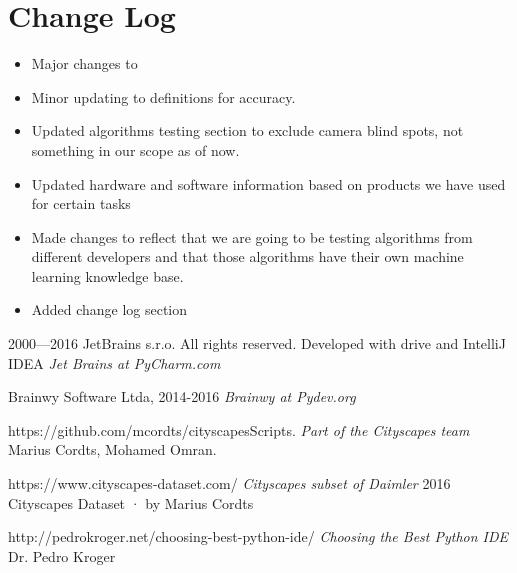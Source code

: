 \documentclass[10pt,draftclsnofoot,onecolumn,journal,compsoc]{IEEEtran}
\begin{document}
	\section{Change Log}
	\begin{itemize}
		\item Major changes to
		\item Minor updating to definitions for accuracy.
		\item Updated algorithms testing section to exclude camera blind spots, not something in our scope as of now.
		\item Updated hardware and software information based on products we have used for certain tasks
		\item Made changes to reflect that we are going to be testing algorithms from different developers and that those algorithms have their own machine learning knowledge base.
		\item Added change log section 
	\end{itemize}
	
	
	\newcommand{\firstdayoffallterm}{2016-09-21}      %
	\newcommand{\startday}{2016-10-02}                %
	\newcommand{\fallprogressreportdue}{2016-12-05}   %
	\newcommand{\alphareleasedue}{2017-02-13}         %
	\newcommand{\betareleasedue}{2017-03-20}          %
	\newcommand{\winterprogressreportdue}{2017-03-20} %
	\newcommand{\releasedue}{2017-05-15}              %
	\newcommand{\expoday}{2017-05-19}                 %
	\newcommand{\finalreportdue}{2017-06-12}          %
	\newcommand{\lastdayofspringterm}{2017-06-16}     %
	
	\newpage
	
	
	\begin{thebibliography}{12}
		 2000—2016 JetBrains s.r.o. All rights reserved. Developed with drive and IntelliJ IDEA
		\textit{Jet Brains at PyCharm.com}
		
		  Brainwy Software Ltda, 2014-2016
		\textit{Brainwy at Pydev.org} 
		
		 https://github.com/mcordts/cityscapesScripts.
		\textit{Part of the Cityscapes team} Marius Cordts, Mohamed Omran.
		
		 https://www.cityscapes-dataset.com/
		\textit{Cityscapes subset of Daimler} 2016 Cityscapes Dataset · by Marius Cordts 
		
		 http://pedrokroger.net/choosing-best-python-ide/
		\textit{Choosing the Best Python IDE} Dr. Pedro Kroger
		
	\end{thebibliography}
	
\end{document}
